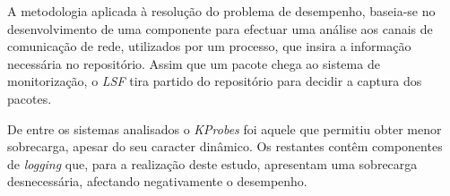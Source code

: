 




%
%


A metodologia aplicada à resolução do problema de desempenho, baseia-se no desenvolvimento de uma componente para efectuar uma análise aos canais de comunicação de rede, utilizados por um processo, que insira a informação necessária no repositório.
Assim que um pacote chega ao sistema de monitorização, o \textit{LSF} tira partido do repositório para decidir a captura dos pacotes.


De entre os sistemas analisados o \textit{KProbes} foi aquele que permitiu obter menor sobrecarga, apesar do seu caracter dinâmico.
Os restantes contêm componentes de \textit{logging} que, para a realização deste estudo, apresentam uma sobrecarga desnecessária, afectando negativamente o desempenho.

